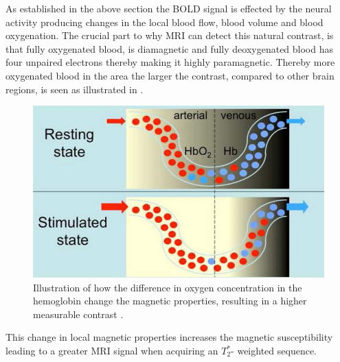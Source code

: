 As established in the above section the BOLD signal is effected by the neural activity producing changes in the local blood flow, blood volume and blood oxygenation. The crucial part to why MRI can detect this natural contrast, is that fully oxygenated blood, is diamagnetic and fully deoxygenated blood has four unpaired electrons thereby making it highly paramagnetic. Thereby more oxygenated blood in the area the larger the contrast, compared to other brain regions, is seen as illustrated in . \cite{Glover2011,Khanna2015,Poldrack2011}

\begin{figure}[H]                 
	\includegraphics[width=.52\textwidth]{figures/aBackground/bold_response}  
	\caption{Illustration of how the difference in oxygen concentration in the hemoglobin change the magnetic properties, resulting in a higher measurable contrast \cite{Glover2011}.}
	\label{fig:back:bold} 
\end{figure}

This change in local magnetic properties increases the magnetic susceptibility leading to a greater MRI signal when acquiring an $T_2^*$- weighted sequence.  
